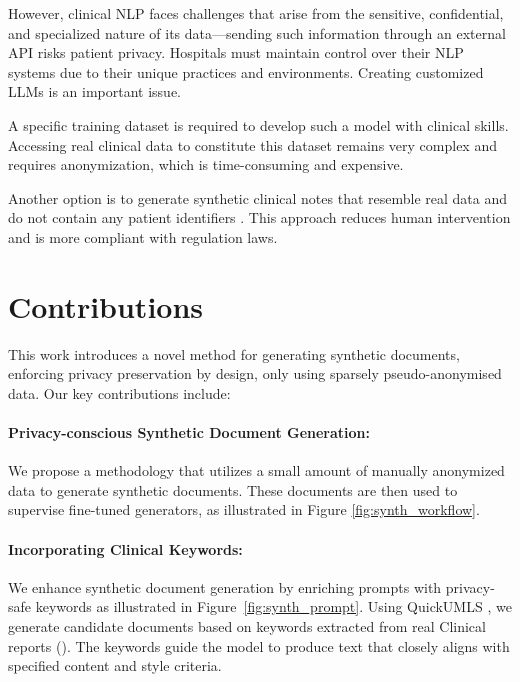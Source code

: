 However, clinical NLP faces challenges that arise from the sensitive, confidential, and specialized nature of its data—sending such information through an external API risks patient privacy. Hospitals must maintain control over their NLP systems due to their unique practices and environments. Creating customized LLMs is an important issue.

A specific training dataset is required to develop such a model with clinical skills. Accessing real clinical data to constitute this dataset remains very complex and requires anonymization, which is time-consuming and expensive. 

Another option is to generate synthetic clinical notes that resemble real data and do not contain any patient identifiers \cite{melamud_towards_2019, ive_generation_2020}. This approach reduces human intervention and is more compliant with regulation laws.

\section{Contributions}

This work introduces a novel method for generating synthetic documents, enforcing privacy preservation by design, only using sparsely pseudo-anonymised data. Our key contributions include:

\paragraph{Privacy-conscious Synthetic Document Generation:} 
    We propose a methodology that utilizes a small amount of manually anonymized data to generate synthetic documents. These documents are then used to supervise fine-tuned generators, as illustrated in Figure \ref{fig:synth_workflow}.

\paragraph{Incorporating Clinical Keywords:} We enhance synthetic document generation by enriching prompts with privacy-safe keywords as illustrated in Figure~\ref{fig:synth_prompt}. Using QuickUMLS \citep{soldaini_quickumls_nodate}, we generate candidate documents based on keywords extracted from real Clinical reports (\crt). The keywords guide the model to produce text that closely aligns with specified content and style criteria.

